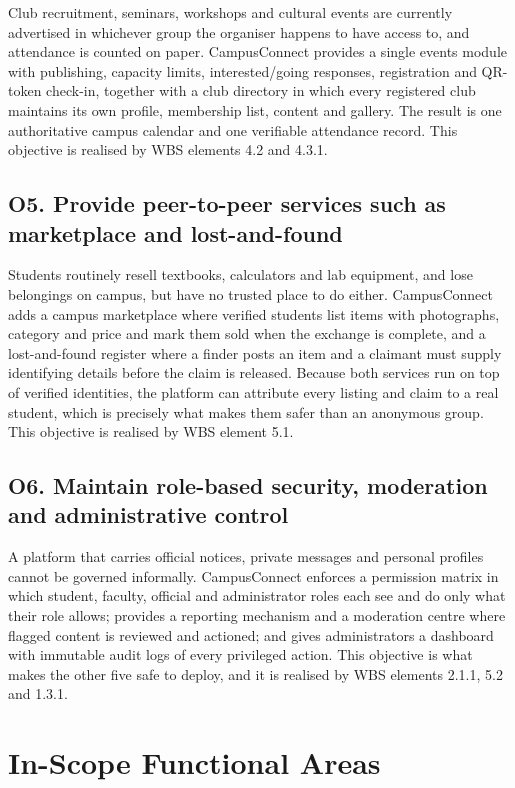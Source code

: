 \documentclass[11pt,a4paper]{report}
\begin{document}
Club recruitment, seminars, workshops and cultural events are currently
advertised in whichever group the organiser happens to have access to, and
attendance is counted on paper. CampusConnect provides a single events module
with publishing, capacity limits, interested/going responses, registration and
QR-token check-in, together with a club directory in which every registered club
maintains its own profile, membership list, content and gallery. The result is
one authoritative campus calendar and one verifiable attendance record. This
objective is realised by WBS elements 4.2 and 4.3.1.

\subsection*{O5. Provide peer-to-peer services such as marketplace and lost-and-found}

Students routinely resell textbooks, calculators and lab equipment, and lose
belongings on campus, but have no trusted place to do either. CampusConnect adds
a campus marketplace where verified students list items with photographs,
category and price and mark them sold when the exchange is complete, and a
lost-and-found register where a finder posts an item and a claimant must supply
identifying details before the claim is released. Because both services run on
top of verified identities, the platform can attribute every listing and claim to
a real student, which is precisely what makes them safer than an anonymous
group. This objective is realised by WBS element 5.1.

\subsection*{O6. Maintain role-based security, moderation and administrative control}

A platform that carries official notices, private messages and personal profiles
cannot be governed informally. CampusConnect enforces a permission matrix in
which student, faculty, official and administrator roles each see and do only
what their role allows; provides a reporting mechanism and a moderation centre
where flagged content is reviewed and actioned; and gives administrators a
dashboard with immutable audit logs of every privileged action. This objective is
what makes the other five safe to deploy, and it is realised by WBS elements
2.1.1, 5.2 and 1.3.1.

\section{In-Scope Functional Areas}
\end{document}
